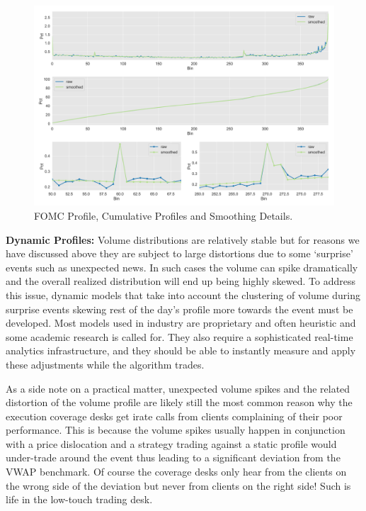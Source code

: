 	\begin{figure}[!ht]
	\centering
	\includegraphics[width=\textwidth]{chapters/chapter_trade_data_models/figures/fomc_profile.png} 
	\caption{FOMC Profile, Cumulative Profiles and Smoothing Details. \label{fig:adv}}
	\end{figure}


\noindent\textbf{Dynamic Profiles:} Volume distributions are relatively stable but for reasons we have discussed above they are subject to large distortions due to some `surprise' events such as unexpected news. In such cases the volume can spike dramatically and the overall realized distribution will end up being highly skewed. To address this issue, dynamic models that take into account the clustering of volume during surprise events skewing rest of the day's profile more towards the event must be developed. Most models used in industry are proprietary and often heuristic and some academic research is called for. They also require a sophisticated real-time analytics infrastructure, and they should be able to instantly measure and apply these adjustments while the algorithm trades.


As a side note on a practical matter, unexpected volume spikes and the related distortion of the volume profile are likely still the most common reason why the execution coverage desks get irate calls from clients complaining of their poor performance. This is because the volume spikes usually happen in conjunction with a price dislocation and a strategy trading against a static profile would under-trade around the event thus leading to a significant deviation from the VWAP benchmark. Of course the coverage desks only hear from the clients on the wrong side of the deviation but never from clients on the right side! Such is life in the low-touch trading desk. 



